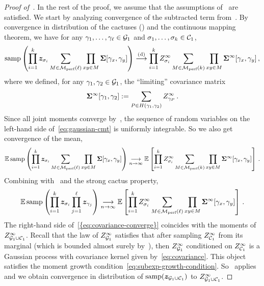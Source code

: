 \begin{proof}[Proof of~]
In the rest of the proof, we assume that
the assumptions of~ are satisfied. 
We start by analyzing convergence of the subtracted term from~. By convergence in distribution of the cactuses () and the continuous mapping theorem, we have for any 
$\gamma_1,\ldots,\gamma_\ell\in{\cal G}_1$ and $\sigma_1,\ldots,\sigma_k\in {\cal C}_1$,
\begin{align}
    \mathrm{samp}\left(\prod_{i=1}^k {\bm z}_{\sigma_i} \sum_{M\in \mathcal{M}_{\textnormal{perf}}(\ell)} \prod_{xy\in M} \bm \Sigma[\gamma_x,\gamma_y]\right) \overset{\textnormal{(d)}}{\longrightarrow} \prod_{i=1}^k Z^\infty_{\sigma_i} \sum_{M\in \mathcal{M}_{\textnormal{perf}}(k)} \prod_{xy\in M} \bm \Sigma^\infty[\gamma_x,\gamma_y]\,,\label{eq:gaussian-cmt}
\end{align}
where we defined, for any $\gamma_1,\gamma_2\in{\cal G}_1$, the ``limiting'' covariance matrix
\begin{align}
    \bm \Sigma^\infty[\gamma_1,\gamma_2] :=  \sum_{P\in H(\gamma_1, \gamma_2)} Z^\infty_{\gamma_P}\,.\label{eq:covariance}
\end{align}
Since all joint moments converge
by~,
the sequence
of random
variables on the left-hand side of~\cref{eq:gaussian-cmt} is uniformly
integrable. So we also get convergence 
of the mean,
\[
    \operatorname*{\mathbb{E}} \mathrm{samp}\left(\prod_{i=1}^k {\bm z}_{\sigma_i} \sum_{M\in \mathcal{M}_{\textnormal{perf}}(\ell)} \prod_{xy\in M} \bm \Sigma[\gamma_x,\gamma_y]\right) \underset{n\to\infty}\longrightarrow \operatorname*{\mathbb{E}}\left[\prod_{i=1}^k Z^\infty_{\sigma_i} \sum_{M\in \mathcal{M}_{\textnormal{perf}}(k)} \prod_{xy\in M} \bm \Sigma^\infty[\gamma_x,\gamma_y]\right]\,.
\]   
Combining with~ and the strong cactus property,
\begin{align}
    \operatorname*{\mathbb{E}} \mathrm{samp}\left(\prod_{i=1}^k {\bm z}_{\sigma_i} \prod_{j=1}^\ell {\bm z}_{\gamma_j}\right) \underset{n\to\infty}\longrightarrow \operatorname*{\mathbb{E}}\left[ \prod_{i=1}^k Z^\infty_{\sigma_i} \sum_{M\in \mathcal{M}_{\textnormal{perf}}(\ell)} \prod_{xy\in M} \bm \Sigma^\infty[\gamma_x,\gamma_y]\right]\,.\label{eq:covariance-converge}
\end{align}
The right-hand side of~\cref{{eq:covariance-converge}}
coincides with the moments of $Z^\infty_{{\cal G}_1\cup {\cal C}_1}$. Recall that the law of
$Z^\infty_{{\cal G}_1}$ satisfies that after sampling
$Z^\infty_{{\cal C}_1}$ from its marginal
(which is bounded almost surely by~), then $Z^\infty_{{\cal G}_1}$
conditioned on $Z^\infty_{{\cal C}_1}$ is a Gaussian
process with covariance kernel given by~\cref{eq:covariance}. This
object satisfies the moment growth
condition~\cref{eq:subexp-growth-condition}. So~
applies and we obtain convergence in
distribution of $\mathrm{samp}({\bm z}_{{\cal G}_1\cup {\cal C}_1})$
to $Z^\infty_{{\cal G}_1\cup {\cal C}_1}$.



\end{proof}
